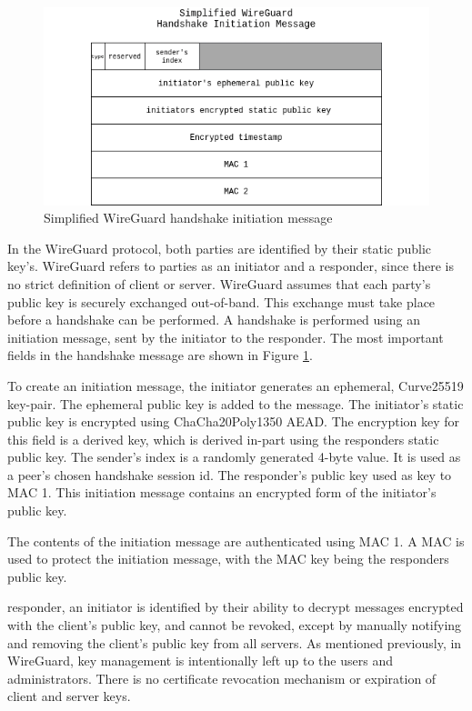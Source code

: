 \documentclass [11pt, proquest] {uwthesis}[2020/02/24]
\begin{document}
\label{handshake_message}

\begin{figure}[ht]
\includegraphics[width=12cm]{paper/images/Wg_hand_init.drawio.png}
\caption{Simplified WireGuard handshake initiation message}
\label{fig:hand_init}
\end{figure}
In the WireGuard protocol, both parties are identified by their static public key's. WireGuard refers to parties as an initiator and a responder, since there is no strict definition of client or server. WireGuard assumes that each party's public key is securely exchanged out-of-band. This exchange must take place before a handshake can be performed. A handshake is performed using an initiation message, sent by the initiator to the responder. The most important fields in the handshake message are shown in Figure \ref{fig:hand_init}.

To create an initiation message, the initiator generates an ephemeral, Curve25519 key-pair. The ephemeral public key is added to the message. The initiator's static public key is encrypted using ChaCha20Poly1350 AEAD. The encryption key for this field is a derived key, which is derived in-part using the responders static public key.
The sender's index is a randomly generated 4-byte value. It is used as a peer's chosen handshake session id.
The responder's public key used as key to MAC 1. This initiation message contains an encrypted form of the initiator's public key.

The contents of the initiation message are authenticated using MAC 1.
A MAC is used to protect the initiation message, with the MAC key being the responders public key.

responder, an initiator is identified by their ability to decrypt messages encrypted with the client's public key, and cannot be revoked, except by manually notifying and removing the client’s public key from all servers. As mentioned previously, in WireGuard, key management is intentionally left up to the users and administrators. There is no certificate revocation mechanism or expiration of client and server keys.
\end{document}
